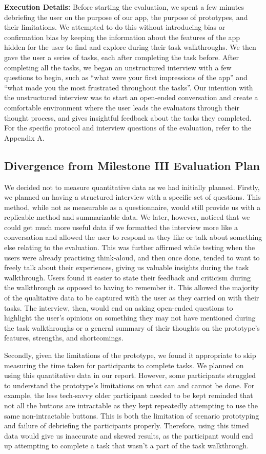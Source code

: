 \documentclass[manuscript, screen, nonacm]{acmart}
\begin{document}
\textbf{Execution Details:} Before starting the evaluation, we spent a few minutes debriefing the user on the purpose of our app, the purpose of prototypes, and their limitations. We attempted to do this without introducing bias or confirmation bias by keeping the information about the features of the app hidden for the user to find and explore during their task walkthroughs. We then gave the user a series of tasks, each after completing the task before. After completing all the tasks, we began an unstructured interview with a few questions to begin, such as “what were your first impressions of the app” and “what made you the most frustrated throughout the tasks”. Our intention with the unstructured interview was to start an open-ended conversation and create a comfortable environment where the user leads the evaluators through their thought process, and gives insightful feedback about the tasks they completed. For the specific protocol and interview questions of the evaluation, refer to the Appendix A.
\subsection{Divergence from Milestone III Evaluation Plan}

We decided not to measure quantitative data as we had initially planned. 
Firstly, we planned on having a structured interview with a specific set of questions. This method, while not as measurable as a questionnaire, would still provide us with a replicable method and summarizable data. We later, however, noticed that we could get much more useful data if we formatted the interview more like a conversation and allowed the user to respond as they like or talk about something else relating to the evaluation. This was further affirmed while testing when the users were already practising think-aloud, and then once done, tended to want to freely talk about their experiences, giving us valuable insights during the task walkthrough. Users found it easier to state their feedback and criticism during the walkthrough as opposed to having to remember it. This allowed the majority of the qualitative data to be captured with the user as they carried on with their tasks. The interview, then, would end on asking open-ended questions to highlight the user's opinions on something they may not have mentioned during the task walkthroughs or a general summary of their thoughts on the prototype’s features, strengths, and shortcomings. 

Secondly, given the limitations of the prototype, we found it appropriate to skip measuring the time taken for participants to complete tasks. We planned on using this quantitative data in our report. However, some participants struggled to understand the prototype's limitations on what can and cannot be done. For example, the less tech-savvy older participant needed to be kept reminded that not all the buttons are intractable as they kept repeatedly attempting to use the same non-intractable buttons. This is both the limitation of scenario prototyping and failure of debriefing the participants properly. Therefore, using this timed data would give us inaccurate and skewed results, as the participant would end up attempting to complete a task that wasn't a part of the task walkthrough.
\end{document}
